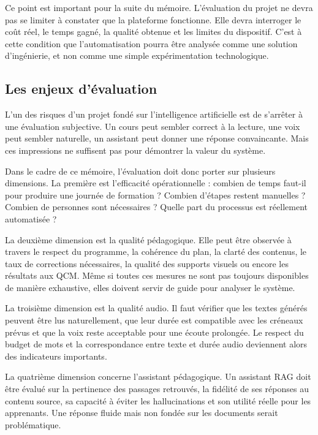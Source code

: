 Ce point est important pour la suite du mémoire. L'évaluation du projet ne devra pas se
limiter à constater que la plateforme fonctionne. Elle devra interroger le coût réel, le
temps gagné, la qualité obtenue et les limites du dispositif. C'est à cette condition que
l'automatisation pourra être analysée comme une solution d'ingénierie, et non comme une
simple expérimentation technologique.

\subsection{Les enjeux d'évaluation}

L'un des risques d'un projet fondé sur l'intelligence artificielle est de s'arrêter à une
évaluation subjective. Un cours peut sembler correct à la lecture, une voix peut sembler
naturelle, un assistant peut donner une réponse convaincante. Mais ces impressions ne
suffisent pas pour démontrer la valeur du système.

Dans le cadre de ce mémoire, l'évaluation doit donc porter sur plusieurs dimensions. La
première est l'efficacité opérationnelle : combien de temps faut-il pour produire une
journée de formation ? Combien d'étapes restent manuelles ? Combien de personnes
sont nécessaires ? Quelle part du processus est réellement automatisée ?

La deuxième dimension est la qualité pédagogique. Elle peut être observée à travers le
respect du programme, la cohérence du plan, la clarté des contenus, le taux de corrections
nécessaires, la qualité des supports visuels ou encore les résultats aux QCM. Même si
toutes ces mesures ne sont pas toujours disponibles de manière exhaustive, elles doivent
servir de guide pour analyser le système.

La troisième dimension est la qualité audio. Il faut vérifier que les textes générés peuvent
être lus naturellement, que leur durée est compatible avec les créneaux prévus et que la
voix reste acceptable pour une écoute prolongée. Le respect du budget de mots et la
correspondance entre texte et durée audio deviennent alors des indicateurs importants.

La quatrième dimension concerne l'assistant pédagogique. Un assistant RAG doit être
évalué sur la pertinence des passages retrouvés, la fidélité de ses réponses au contenu
source, sa capacité à éviter les hallucinations et son utilité réelle pour les apprenants. Une
réponse fluide mais non fondée sur les documents serait problématique.

